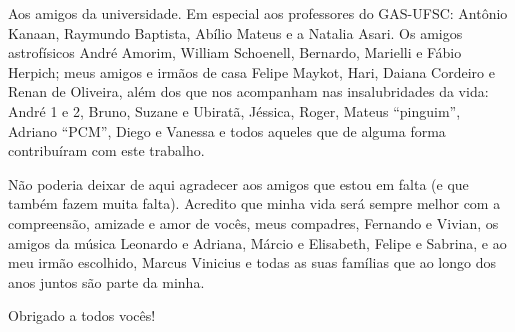 Aos amigos da universidade. Em especial aos professores do GAS-UFSC: Antônio Kanaan, Raymundo Baptista, Abílio Mateus e
a Natalia Asari. Os amigos astrofísicos André Amorim, William Schoenell, Bernardo, Marielli e Fábio Herpich; meus amigos
e irmãos de casa Felipe Maykot, Hari, Daiana Cordeiro e Renan de Oliveira, além dos que nos acompanham nas
insalubridades da vida: André 1 e 2, Bruno, Suzane e Ubiratã, Jéssica, Roger, Mateus ``pinguim'', Adriano ``PCM'', Diego
e Vanessa e todos aqueles que de alguma forma contribuíram com este trabalho.

Não poderia deixar de aqui agradecer aos amigos que estou em falta (e que também fazem muita falta). Acredito que minha
vida será sempre melhor com a compreensão, amizade e amor de vocês, meus compadres, Fernando e Vivian, os amigos da
música Leonardo e Adriana, Márcio e Elisabeth, Felipe e Sabrina, e ao meu irmão escolhido, Marcus Vinicius e todas as
suas famílias que ao longo dos anos juntos são parte da minha.

Obrigado a todos vocês!

